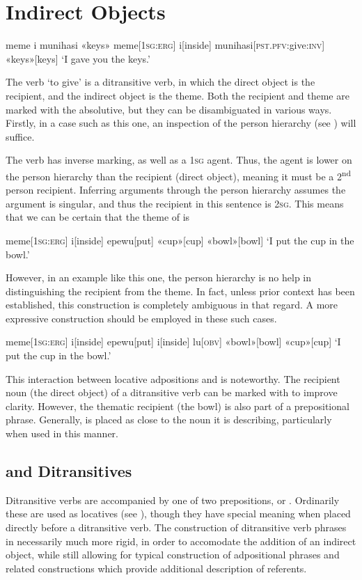 \section{Indirect Objects}
\ex
\begingl
\glpreamble meme i munihasi «keys»
\endpreamble
meme[\textsc{1sg:erg}]
i[inside]
munihasi[\textsc{pst.pfv:}give\textsc{:inv}]
«keys»[keys]
\glft `I gave you the keys.'
\endgl
\xe

The verb  `to give' is a ditransitive verb, in which the direct object is the recipient, and the indirect object is the theme. Both the recipient and theme are marked with the absolutive, but they can be disambiguated in various ways. Firstly, in a case such as this one, an inspection of the person hierarchy (see ) will suffice.

The verb  has inverse marking, as well as a \textsc{1sg} agent. Thus, the agent is lower on the person hierarchy than the recipient (direct object), meaning it must be a 2\textsuperscript{nd} person recipient. Inferring arguments through the person hierarchy assumes the argument is singular, and thus the recipient in this sentence is \textsc{2sg}. This means that we can be certain that the theme of  is 

\ex
\begingl
\glpreamble
\pronounced{}\endpreamble
meme[\textsc{1sg:erg}]
i[inside]
epewu[put]
«cup»[cup]
«bowl»[bowl]
\glft `I put the cup in the bowl.'
\endgl
\xe

However, in an example like this one, the person hierarchy is no help in distinguishing the recipient from the theme. In fact, unless prior context has been established, this construction is completely ambiguous in that regard. A more expressive construction should be employed in these such cases.

\ex
\begingl
\glpreamble
\pronounced{}\endpreamble
meme[\textsc{1sg:erg}]
i[inside]
epewu[put]
i[inside]
lu[\textsc{obv}]
«bowl»[bowl]
«cup»[cup]
\glft `I put the cup in the bowl.'
\endgl
\xe

This interaction between locative adpositions and  is noteworthy. The recipient noun (the direct object) of a ditransitive verb can be marked with  to improve clarity. However, the thematic recipient (the bowl) is also part of a prepositional phrase. Generally,  is placed as close to the noun it is describing, particularly when used in this manner.

\subsection{ and  Ditransitives}
Ditransitive verbs are accompanied by one of two prepositions,  or . Ordinarily these are used as locatives (see ), though they have special meaning when placed directly before a ditransitive verb. The construction of ditransitive verb phrases in necessarily much more rigid, in order to accomodate the addition of an indirect object, while still allowing for typical construction of adpositional phrases and related constructions which provide additional description of referents.

